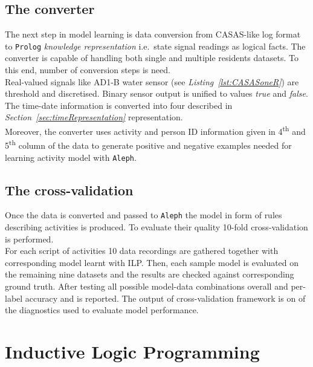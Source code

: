 \documentclass[12pt, a4paper, pdflatex, leqno, twoside, openright]{report}
\newcommand{\ts}{\textsuperscript}
\begin{document}
  \section{The converter}
The next step in model learning is data conversion from CASAS-like log format to \texttt{Prolog} \emph{knowledge representation} i.e.\ state signal readings as logical facts. The converter is capable of handling both single and multiple residents datasets. To this end, number of conversion steps is need.\\

Real-valued signals like AD1-B water sensor (see \emph{Listing~\ref{lst:CASASoneR}}) are threshold and discretised. Binary sensor output is unified to values \emph{true} and \emph{false}. The time-date information is converted into four described in \emph{Section~\ref{sec:timeRepresentation}} representation.\\
Moreover, the converter uses activity and person ID information given in 4\ts{th} and 5\ts{th} column of the data to generate positive and negative examples needed for learning activity model with \texttt{Aleph}.

  \section{The cross-validation}
Once the data is converted and passed to \texttt{Aleph} the model in form of rules describing activities is produced. To evaluate their quality 10-fold cross-validation is performed.\\
For each script of activities 10 data recordings are gathered together with corresponding model learnt with ILP. Then, each sample model is evaluated on the remaining nine datasets and the results are checked against corresponding ground truth. After testing all possible model-data combinations overall and per-label accuracy and is reported. The output of cross-validation framework is on of the diagnostics used to evaluate model performance.

\chapter{Inductive Logic Programming\label{ch:ILP}}
\end{document}
